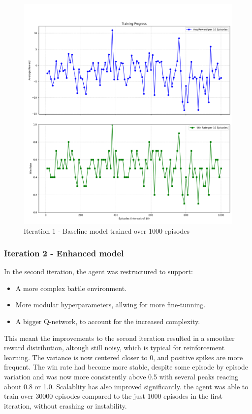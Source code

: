 \begin{figure}[H]
    \centering
    \includegraphics[width=\textwidth]{assets/Iteration-1-graphs.png}
    \caption{Iteration 1 - Baseline model trained over 1000 episodes}
    \label{fig:iteration-1-graphs}
\end{figure}

\subsubsection{Iteration 2 - Enhanced model}
In the second iteration, the agent was restructured to support:
\begin{itemize}
    \item A more complex battle environment.
    \item More modular hyperparameters, allwing for more fine-tunning.
    \item A bigger Q-network, to account for the increased complexity.
\end{itemize}
This meant the improvements to the second iteration resulted in a smoother reward
distribution, altough still noisy, which is typical for reinforcement learning. The variance
is now centered closer to 0, and positive spikes are more frequent. The win rate
had become more stable, despite some episode by episode variation
and was now more consistently above 0.5 with several peaks reacing about 0.8 or 1.0.
Scalablity has also improved significantly. the agent was able to train over 30000 episodes
compared to the just 1000 episodes in the first iteration, without crashing or instability.


